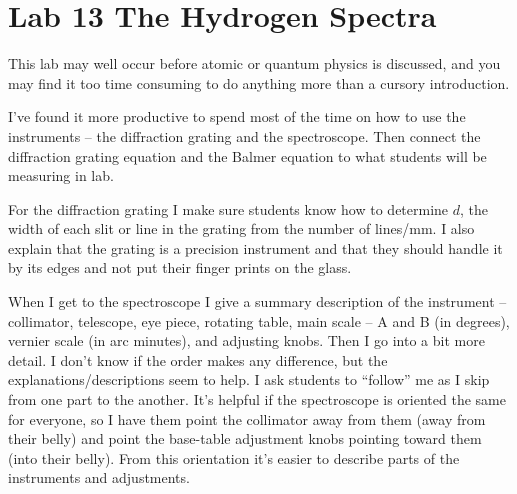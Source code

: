 \section{Lab 13 The Hydrogen Spectra}
This lab may well occur before atomic or quantum physics is discussed, and you may find it too time consuming to do anything more than a cursory introduction.

I've found it more productive to spend most of the time on how to use the instruments -- the diffraction grating and the spectroscope. Then connect the diffraction grating equation and the Balmer equation to what students will be measuring in lab.

For the diffraction grating I make sure students know how to determine $d$, the width of each slit or line in the grating from the number of lines/mm. I also explain that the grating is a precision instrument and that they should handle it by its edges and not put their finger prints on the glass.

When I get to the spectroscope I give a summary description of the instrument -- collimator, telescope, eye piece, rotating table, main scale -- A and B (in degrees), vernier scale (in arc minutes), and adjusting knobs. Then I go into a bit more detail. I don't know if the order makes any difference, but the explanations/descriptions seem to help. I ask students to  ``follow'' me as I skip from one part to the another. It's helpful if the spectroscope is oriented the same for everyone, so I have them point the collimator away from them (away from their belly) and point the base-table adjustment knobs pointing toward them (into their belly). From this orientation it's easier to describe parts of the instruments and adjustments.


